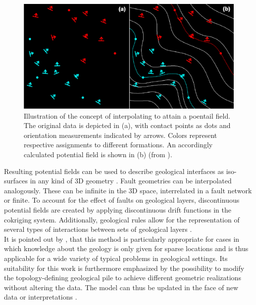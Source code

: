 		\begin{figure}[h]
			\centering
			\includegraphics[width=1\textwidth]{Figures/calcagno_pot_field.png}
			\caption{Illustration of the concept of interpolating to attain a poentail field. The original data is depicted in (a), with contact points as dots and orientation measurements indicated by arrows. Colors represent respective assignments to different formations. An accordingly calculated potential field is shown in (b) (from \citet{calcagno2008geological}).}\label{fig:pot_field}
		\end{figure}        
        Resulting potential fields can be used to describe geological interfaces as iso-surfaces in any kind of 3D geometry \citep{calcagno2008geological}. Fault geometries can be interpolated analogously. These can be infinite in the 3D space, interrelated in a fault network or finite. To account for the effect of faults on geological layers, discontinuous potential fields are created by applying discontinuous drift functions in the cokriging system. Additionally, geological rules allow for the representation of several types of interactions between sets of geological layers \citep{calcagno2008geological}.\\
        It is pointed out by \citet{calcagno2008geological}, that this method is particularly appropriate for cases in which knowledge about the geology is only given for sparse locations and is thus applicable for a wide variety of typical problems in geological settings. Its suitability for this work is furthermore emphasized by the possibility to modify the topology-defining geological pile to achieve different geometric realizations without altering the data. The model can thus be updated in the face of new data or interpretations \citep{calcagno2008geological}. 
     
